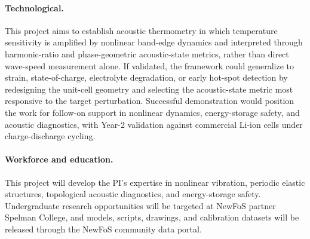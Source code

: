 \documentclass[11pt]{article}
\begin{document}
\paragraph{Technological.}
This project aims to establish acoustic thermometry in which temperature sensitivity is amplified by nonlinear band-edge dynamics and interpreted through harmonic-ratio and phase-geometric acoustic-state metrics, rather than direct wave-speed measurement alone. If validated, the framework could generalize to strain, state-of-charge, electrolyte degradation, or early hot-spot detection by redesigning the unit-cell geometry and selecting the acoustic-state metric most responsive to the target perturbation. Successful demonstration would position the work for follow-on support in nonlinear dynamics, energy-storage safety, and acoustic diagnostics, with Year-2 validation against commercial Li-ion cells under charge-discharge cycling.

\paragraph{Workforce and education.}
This project will develop the PI's expertise in nonlinear vibration, periodic elastic structures, topological acoustic diagnostics, and energy-storage safety. Undergraduate research opportunities will be targeted at NewFoS partner Spelman College, and models, scripts, drawings, and calibration datasets will be released through the NewFoS community data portal.

{%
\renewcommand*{\bibfont}{\scriptsize}
\setlength{\bibitemsep}{1pt}
\setlength{\bibnamesep}{0pt}
\printbibliography
}
\end{document}
